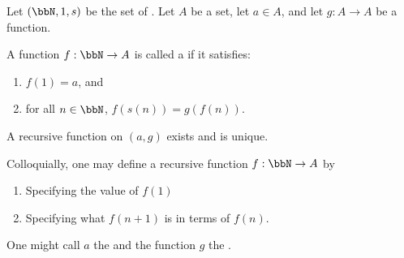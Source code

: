 \begin{definition} \label{definition:recursive_function_on_naturals}
Let $(\bbN, 1, s)$ be the set of . Let $A$ be a set, let $a \in A$, and let $g: A \to A$ be a function.

A function $f: \bbN \to A$ is called a  if it satisfies:
\begin{enumerate}
    \item $f(1) = a$, and
    \item for all $n \in \bbN$, $f(s(n)) = g(f(n))$.
\end{enumerate}
A recursive function on $(a,g)$ exists and is unique.

Colloquially, one may define a recursive function $f: \bbN \to A$ by 
\begin{enumerate}
    \item Specifying the value of $f(1)$
    \item Specifying what $f(n+1)$ is in terms of $f(n)$.
\end{enumerate}
One might call $a$ the  and the function $g$ the .
\end{definition}